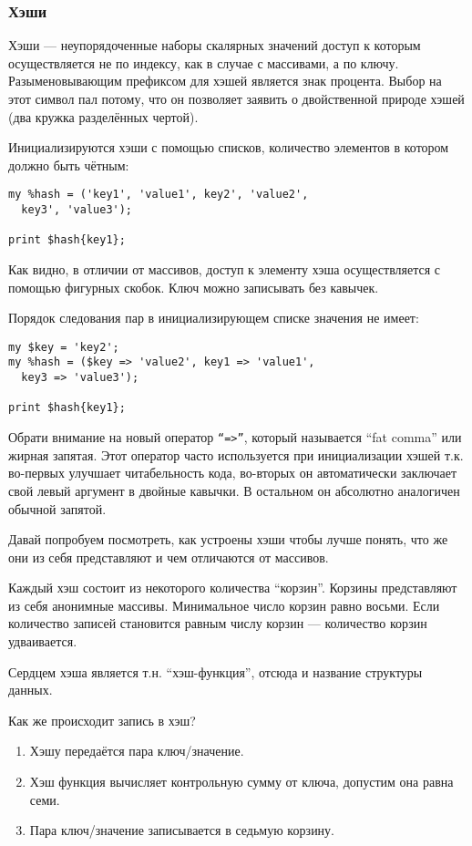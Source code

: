 \subsubsection{Хэши}

Хэши --- неупорядоченные наборы скалярных значений доступ к которым осуществляется не по индексу, как в случае с массивами, а по ключу. Разыменовывающим префиксом для хэшей является знак процента. Выбор на этот символ пал потому, что он позволяет заявить о двойственной природе хэшей (два кружка разделённых чертой).

Инициализируются хэши с помощью списков, количество элементов в котором должно быть чётным:
\begin{verbatim}
my %hash = ('key1', 'value1', key2', 'value2',
  key3', 'value3');

print $hash{key1};
\end{verbatim}

Как видно, в отличии от массивов, доступ к элементу хэша осуществляется с помощью фигурных скобок. Ключ можно записывать без кавычек.

Порядок следования пар в инициализирующем списке значения не имеет:

\begin{verbatim}
my $key = 'key2';
my %hash = ($key => 'value2', key1 => 'value1',
  key3 => 'value3');

print $hash{key1};
\end{verbatim}

Обрати внимание на новый оператор \texttt{``=>''}, который называется ``fat comma'' или жирная запятая. Этот оператор часто используется при инициализации хэшей т.к. во-первых улучшает читабельность кода, во-вторых он автоматически заключает свой левый аргумент в двойные кавычки. В остальном он абсолютно аналогичен обычной запятой.

Давай попробуем посмотреть, как устроены хэши чтобы лучше понять, что же они из себя представляют и чем отличаются от массивов.

Каждый хэш состоит из некоторого количества ``корзин''. Корзины представляют из себя анонимные массивы. Минимальное число корзин равно восьми. Если количество записей становится равным числу корзин --- количество корзин удваивается.

Сердцем хэша является т.н. ``хэш-функция'', отсюда и название структуры данных.

Как же происходит запись в хэш?

\begin{enumerate}
\item Хэшу передаётся пара ключ/значение.
\item Хэш функция вычисляет контрольную сумму от ключа, допустим она равна семи.
\item Пара ключ/значение записывается в седьмую корзину. 
\end{enumerate}

